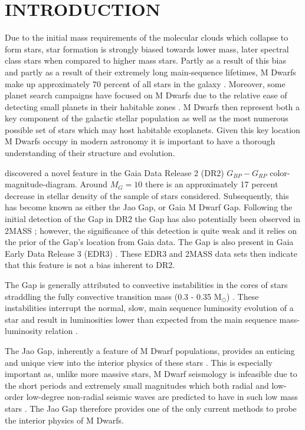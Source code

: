 \section{INTRODUCTION}\label{sec:intro}
Due to the initial mass requirements of the molecular clouds which collapse to
form stars, star formation is strongly biased towards lower mass, later
spectral class stars when compared to higher mass stars. Partly as a result of
this bias and partly as a result of their extremely long main-sequence
lifetimes, M Dwarfs make up approximately 70 percent of all stars in the galaxy
\citep{Winters2019}. Moreover, some planet search campaigns have focused on M
Dwarfs due to the relative ease of detecting small planets in their habitable
zones \citep[e.g.][]{Nut08}. M Dwarfs then represent both a key component of
the galactic stellar population as well as the most numerous possible set of
stars which may host habitable exoplanets. Given this key location M Dwarfs
occupy in modern astronomy it is important to have a thorough understanding of
their structure and evolution.

\citet{Jao2018} discovered a novel feature in the Gaia Data Release 2 (DR2)
$G_{BP}-G_{RP}$ color-magnitude-diagram. Around $M_{G}=10$ there is an
approximately 17 percent decrease in stellar density of the sample of stars
\citet{Jao2018} considered. Subsequently, this has become known as either the
Jao Gap, or Gaia M Dwarf Gap. Following the initial detection of the Gap in DR2
the Gap has also potentially been observed in 2MASS \citep{Skrutskie2006,
Jao2018}; however, the significance of this detection is quite weak and it
relies on the prior of the Gap's location from Gaia data. The Gap is
also present in Gaia Early Data Release 3 (EDR3) \citep{Jao2021}. These EDR3
and 2MASS data sets then indicate that this feature is not a bias inherent to
DR2.

The Gap is generally attributed to convective instabilities in the cores of
stars straddling the fully convective transition mass (0.3 - 0.35 M$_{\odot}$)
\citep{Baraffe2018}. These instabilities interrupt the normal, slow, main
sequence luminosity evolution of a star and result in luminosities lower
than expected from the main sequence mass-luminosity relation \citep{Jao2020}.

The Jao Gap, inherently a feature of M Dwarf populations, provides an enticing
and unique view into the interior physics of these stars \citep{Feiden2021}.
This is especially important as, unlike more massive stars, M Dwarf seismology
is infeasible due to the short periods and extremely small
magnitudes which both radial and low-order low-degree non-radial seismic waves
are predicted to have in such low mass stars \citep{Rodriguez-Lopez2019}. The
Jao Gap therefore provides one of the only current methods to probe the
interior physics of M Dwarfs.

